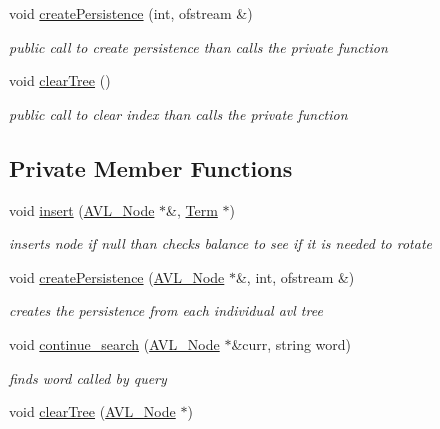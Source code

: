 \begin{DoxyCompactItemize}
void \hyperlink{class_a_v_l_tree_index_a43269725295571c3cd41075e7dfc1c24}{create\+Persistence} (int, ofstream \&)
\begin{DoxyCompactList}\small\item\em public call to create persistence than calls the private function \end{DoxyCompactList}\item 
void \hyperlink{class_a_v_l_tree_index_a5de8f71edf00da8fecbd365df562a18e}{clear\+Tree} ()
\begin{DoxyCompactList}\small\item\em public call to clear index than calls the private function \end{DoxyCompactList}\end{DoxyCompactItemize}
\subsection*{Private Member Functions}
\begin{DoxyCompactItemize}
\item 
void \hyperlink{class_a_v_l_tree_index_a5891589c2c753ef4dbe902f35c9385c7}{insert} (\hyperlink{struct_a_v_l___node}{A\+V\+L\+\_\+\+Node} $\ast$\&, \hyperlink{class_term}{Term} $\ast$)
\begin{DoxyCompactList}\small\item\em inserts node if null than checks balance to see if it is needed to rotate \end{DoxyCompactList}\item 
void \hyperlink{class_a_v_l_tree_index_a9e82ee4cbd75a1a21d4151d188c77d75}{create\+Persistence} (\hyperlink{struct_a_v_l___node}{A\+V\+L\+\_\+\+Node} $\ast$\&, int, ofstream \&)
\begin{DoxyCompactList}\small\item\em creates the persistence from each individual avl tree \end{DoxyCompactList}\item 
void \hyperlink{class_a_v_l_tree_index_a070e14c282a51451f92805cc8b80b6fd}{continue\+\_\+search} (\hyperlink{struct_a_v_l___node}{A\+V\+L\+\_\+\+Node} $\ast$\&curr, string word)
\begin{DoxyCompactList}\small\item\em finds word called by query \end{DoxyCompactList}\item 
void \hyperlink{class_a_v_l_tree_index_a4e37d288ef8d47138f1ca31c5c5251c5}{clear\+Tree} (\hyperlink{struct_a_v_l___node}{A\+V\+L\+\_\+\+Node} $\ast$)
\end{DoxyCompactItemize}
